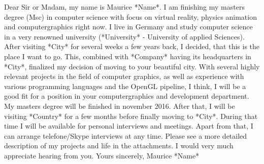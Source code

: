 \documentclass[a4paper, 12pt]{article}
\begin{document}
\justify
Dear Sir or Madam,
\newline
\newline
my name is Maurice \**Name*. I am finishing my masters degree (Msc) in computer science with focus on virtual reality, physics animation
and computergraphics right now.
\newline
\newline
I live in Germany and study computer science in a very renowned university (\**University* - University of applied Sciences).
After visiting \**City* for several weeks a few years back, I decided, that this is the place I want to go. This, combined with \**Company* having its
headquarters in \**City*, finalized my decision of moving to your beautiful city.
\newline
\newline
With several highly relevant projects in the field of computer graphics, as well as experience with various programming languages and the
OpenGL pipeline, I think, I will be a good fit for a position in your computergraphics and development department.
\newline
\newline
My masters degree will be finished in november 2016. After that, I will be visiting \**Country* for a few months before finally moving to
\**City*.
During that time I will be available for personal interviews and meetings. Apart from that, I can arrange telefone/Skype interviews at any time.
Please see a more detailed description of my projects and life in the attachments.
\newline
\newline
I would very much appreciate hearing from you.
\newline
\newline
Yours sincerely,
\newline
\newline
Maurice \**Name*
\end{document}
